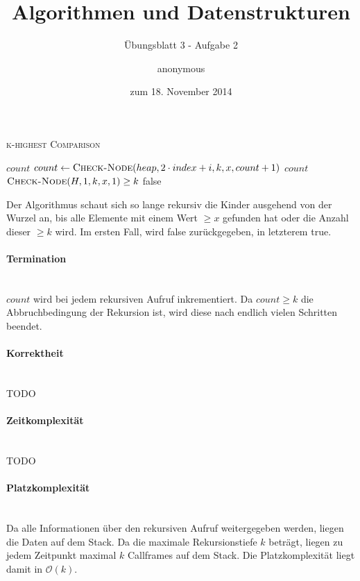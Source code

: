 \documentclass[a4paper]{scrartcl}
\title{Algorithmen und Datenstrukturen}
\subtitle{Übungsblatt 3 - Aufgabe 2}
\author{
    anonymous
}
\date{zum 18. November 2014}
\begin{document}
\maketitle


\begin{algorithm}
    \caption{\textsc{k-highest Comparison}}
    \begin{algorithmic}[1]
                    \State \Return $count$
                \EndIf
                    \State $count \gets \Call{Check-Node}{heap, 2 \cdot index + i, k, x, count + 1}$
                \EndIf
            \EndFor
            \State \Return $count$
        \EndProcedure
        \Statex
                \State \Return $\Call{Check-Node}{H, 1, k, x, 1} \geq k$
            \EndIf
            \State \Return false
        \EndProcedure
    \end{algorithmic}
\end{algorithm}

Der Algorithmus schaut sich so lange rekursiv die Kinder ausgehend von der
Wurzel an, bis alle Elemente mit einem Wert $\geq x$ gefunden hat oder die
Anzahl dieser $\geq k$ wird.
Im ersten Fall, wird false zurückgegeben, in letzterem true.

\paragraph{Termination} \hfill \\
$count$ wird bei jedem rekursiven Aufruf inkrementiert.
Da $count \geq k$ die Abbruchbedingung der Rekursion ist, wird diese nach
endlich vielen Schritten beendet.

\paragraph{Korrektheit} \hfill \\
TODO

\paragraph{Zeitkomplexität} \hfill \\
TODO

\paragraph{Platzkomplexität} \hfill \\
Da alle Informationen über den rekursiven Aufruf weitergegeben werden, liegen
die Daten auf dem Stack.
Da die maximale Rekursionstiefe $k$ beträgt, liegen zu jedem Zeitpunkt maximal
$k$ Callframes auf dem Stack.
Die Platzkomplexität liegt damit in $\mathcal{O}(k)$.
\end{document}
